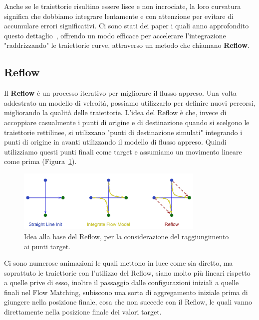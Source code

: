 Anche se le traiettorie risultino essere lisce e non incrociate, la loro curvatura significa che dobbiamo integrare lentamente e con attenzione per evitare di accumulare errori significativi. Ci sono stati dei paper i quali anno approfondito questo dettaglio~\cite{lipman2023flow}, offrendo un modo efficace per accelerare l'integrazione "raddrizzando" le traiettorie curve, attraverso un metodo che chiamano \textbf{Reflow}.

\subsection{Reflow}
Il \textbf{Reflow} è un processo iterativo per migliorare il flusso appreso. Una volta addestrato un modello di velcoità, possiamo utilizzarlo per definire nuovi percorsi, migliorando la qualità delle traiettorie. L'idea del Reflow è che, invece di accoppiare casualmente i punti di origine e di destinazione quando si scelgono le traiettorie rettilinee, si utilizzano "punti di destinazione simulati" integrando i punti di origine in avanti utilizzando il modello di flusso appreso. Quindi utilizziamo questi punti finali come target e assumiamo un movimento lineare come prima (Figura~\ref{fig:reflow}).
\begin{figure}
    \centering
    \includegraphics[width=0.8\textwidth]{figure/Reflow}
    \caption{Idea alla base del Reflow, per la considerazione del raggiungimento ai punti target.}
    \label{fig:reflow}
\end{figure}
Ci sono numerose animazioni le quali mettono in luce come sia diretto, ma soprattuto le traiettorie con l'utilizzo del Reflow, siano molto più lineari rispetto a quelle prive di esso, inoltre il passaggio dalle configurazioni iniziali a quelle finali nel Flow Matching, subiscono una sorta di aggregamento iniziale prima di giungere nella posizione finale, cosa che non succede con il Reflow, le quali vanno direttamente nella posizione finale dei valori target.

